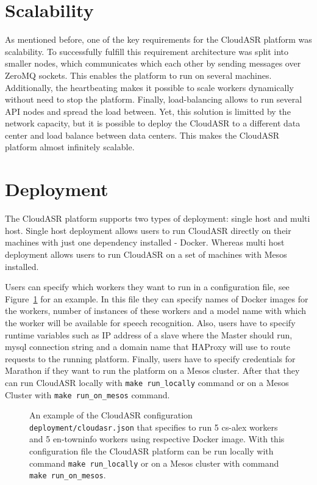 \section{Scalability}
As mentioned before, one of the key requirements for the CloudASR platform was scalability.
To successfully fulfill this requirement architecture was split into smaller nodes,
  which communicates which each other by sending messages over ZeroMQ sockets.
This enables the platform to run on several machines.
Additionally, the heartbeating makes it possible to scale workers dynamically without need to stop the platform.
Finally, load-balancing allows to run several API nodes and spread the load between.
Yet, this solution is limitted by the network capacity,
  but it is possible to deploy the CloudASR to a different data center
  and load balance between data centers.
This makes the CloudASR platform almost infinitely scalable.


\section{Deployment}
The CloudASR platform supports two types of deployment: single host and multi host.
Single host deployment allows users to run CloudASR directly on their machines with just one dependency installed - Docker.
Whereas multi host deployment allows users to run CloudASR on a set of machines with Mesos installed.

Users can specify which workers they want to run in a configuration file,
  see Figure~\ref{fig:cloudasr-json} for an example.
In this file they can specify names of Docker images for the workers,
  number of instances of these workers
  and a model name with which the worker will be available for speech recognition.
Also, users have to specify runtime variables such as IP address of a slave where the Master should run,
  mysql connection string and
  a domain name that HAProxy will use to route requests to the running platform.
Finally, users have to specify credentials for Marathon if they want to run the platform on a Mesos cluster.
After that they can run CloudASR locally with \texttt{make run\_locally} command
  or on a Mesos Cluster with \texttt{make run\_on\_mesos} command.

\begin{figure}[h]
  

  \caption{
     An example of the CloudASR configuration \texttt{deployment/cloudasr.json}
       that specifies to run 5 cs-alex workers and 5 en-towninfo workers
       using respective Docker image.
     With this configuration file the CloudASR platform can be run locally with command \texttt{make run\_locally}
       or on a Mesos cluster with command \texttt{make run\_on\_mesos}.
  }
  \label{fig:cloudasr-json}
\end{figure}


